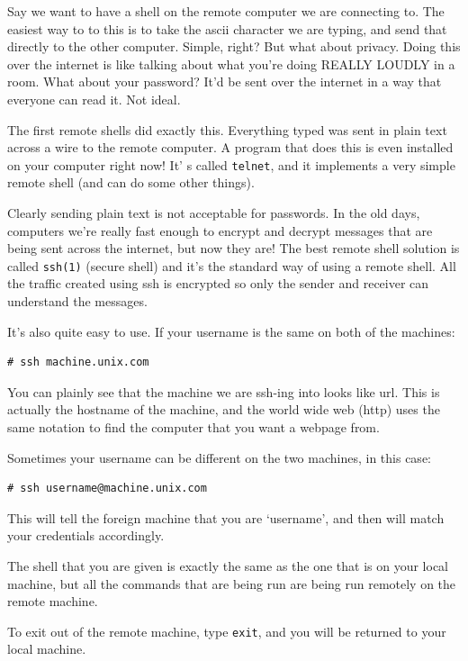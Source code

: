 Say we want to have a shell on the remote computer we are connecting to. The easiest way 
to to this is to take the ascii character we are typing, and send that directly to the other
computer. Simple, right? But what about privacy. Doing this over the internet is like talking
about what you're doing REALLY LOUDLY in a room. What about your password? It'd be sent over the 
internet in a way that everyone can read it. Not ideal. 

The first remote shells did exactly this. Everything typed was sent in plain text across a wire to 
the remote computer. A program that does this is even installed on your computer right now! It' s
called {\tt telnet}, and it implements a very simple remote shell (and can do some other things).

Clearly sending plain text is not acceptable for passwords. In the old days, computers we're
really fast enough to encrypt and decrypt messages that are being sent across the internet,
but now they are! The best remote shell solution is called {\tt ssh(1)} (secure shell) and it's 
the standard way of using a remote shell. All the traffic created using ssh is encrypted so only the 
sender and receiver can understand
the messages. 

It's also quite easy to use. If your username is the same on both of the machines:

\begin{verbatim}
# ssh machine.unix.com
\end{verbatim}    

You can plainly see that the machine we are ssh-ing into looks like url. This is 
actually the hostname of the machine, and the world wide web (http) uses the same
notation to find the computer that you want a webpage from.

Sometimes your username can be different on the two machines, in this case:

\begin{verbatim}
# ssh username@machine.unix.com 
\end{verbatim}

This will tell the foreign machine that you are `username', and then will
match your credentials accordingly. 

The shell that you are given is exactly the same as the one that is on your local 
machine, but all the commands that are being run are being run 
remotely on the remote machine.

To exit out of the remote machine, type {\tt exit}, and you will be returned 
to your local machine.  

